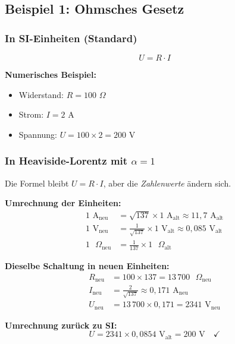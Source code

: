 	\subsection{Beispiel 1: Ohmsches Gesetz}
	
	\subsubsection{In SI-Einheiten (Standard)}
	
	\begin{equation}
		U = R \cdot I
	\end{equation}
	
	\textbf{Numerisches Beispiel:}
	\begin{itemize}
		\item Widerstand: $R = 100$ $\Omega$
		\item Strom: $I = 2$ A
		\item Spannung: $U = 100 \times 2 = 200$ V
	\end{itemize}
	
	\subsubsection{In Heaviside-Lorentz mit $\alpha = 1$}
	
	Die Formel bleibt $U = R \cdot I$, aber die \textit{Zahlenwerte} ändern sich.
	
	\textbf{Umrechnung der Einheiten:}
	\begin{align}
		1 \text{ A}_{\text{neu}} &= \sqrt{137} \times 1 \text{ A}_{\text{alt}} \approx 11{,}7 \text{ A}_{\text{alt}} \\
		1 \text{ V}_{\text{neu}} &= \frac{1}{\sqrt{137}} \times 1 \text{ V}_{\text{alt}} \approx 0{,}085 \text{ V}_{\text{alt}} \\
		1 \text{ }\Omega_{\text{neu}} &= \frac{1}{137} \times 1 \text{ }\Omega_{\text{alt}}
	\end{align}
	
	\textbf{Dieselbe Schaltung in neuen Einheiten:}
	\begin{align}
		R_{\text{neu}} &= 100 \times 137 = 13\,700 \text{ }\Omega_{\text{neu}} \\
		I_{\text{neu}} &= \frac{2}{\sqrt{137}} \approx 0{,}171 \text{ A}_{\text{neu}} \\
		U_{\text{neu}} &= 13\,700 \times 0{,}171 = 2341 \text{ V}_{\text{neu}}
	\end{align}
	
	\textbf{Umrechnung zurück zu SI:}
	\begin{equation}
		U = 2341 \times 0{,}0854 \text{ V}_{\text{alt}} = 200 \text{ V} \quad \checkmark
	\end{equation}
	
